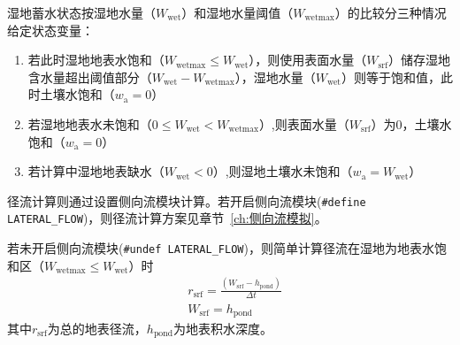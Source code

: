 湿地蓄水状态按湿地水量（$W_{\mathrm{wet}}$）和湿地水量阈值（$W_{\mathrm{wetmax}}$）的比较分三种情况给定状态变量：

\begin{enumerate}
  \item 若此时湿地地表水饱和（$W_{\mathrm{wetmax}} \leq W_{\mathrm{wet}}$），则使用表面水量（$W_{\mathrm{srf}}$）储存湿地含水量超出阈值部分（$W_{\mathrm{wet}}-W_{\mathrm{wetmax}}$），湿地水量（$W_{\mathrm{wet}}$）则等于饱和值，此时土壤水饱和（$w_{\mathrm{a}}=0$）

  \item 若湿地地表水未饱和（$0 \leq W_{\mathrm{wet}} < W_{\mathrm{wetmax}}$）,则表面水量（$W_{\mathrm{srf}}$）为0，土壤水饱和（$w_{\mathrm{a}}=0$）

  \item 若计算中湿地地表缺水（$W_{\mathrm{wet}} < 0$）,则湿地土壤水未饱和（$w_{\mathrm{a}}=W_{\mathrm{wet}}$）
\end{enumerate}

径流计算则通过设置侧向流模块计算。若开启侧向流模块(\texttt{\#define LATERAL\_FLOW})，则径流计算方案见章节~\ref{ch:侧向流模拟}。

若未开启侧向流模块(\texttt{\#undef LATERAL\_FLOW})，则简单计算径流在湿地为地表水饱和区（$W_{\mathrm{wetmax}} \leq W_{\mathrm{wet}}$）时
\begin{equation}
  \begin{aligned}
    &r_{\mathrm{srf}}=\frac{\left(W_{\mathrm{srf}}-h_{\mathrm{pond}}\right)}{\Delta t} \\
    &W_{\mathrm{srf}}=h_{\mathrm{pond}}
  \end{aligned}
\end{equation}
其中$r_{\mathrm{srf}}$为总的地表径流，$h_{\mathrm{pond}}$为地表积水深度。
